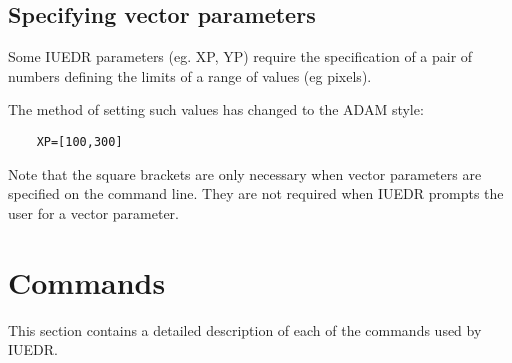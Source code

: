 \subsection{Specifying vector parameters}

Some IUEDR parameters (eg. XP, YP) require the specification of a pair
of numbers defining the limits of a range of values (eg pixels).

The method of setting such values has changed to the ADAM style:

\begin{verbatim}
	XP=[100,300]
\end{verbatim}

Note that the square brackets are only necessary when vector
parameters are specified on the command line. They are not required
when IUEDR prompts the user for a vector parameter.

\newpage

\section {Commands}

This section contains a detailed description of each of the commands
used by IUEDR.
 
